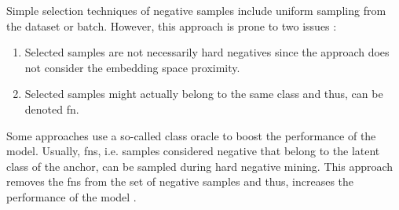 Simple selection techniques of negative samples include uniform sampling from the dataset or batch.
However, this approach is prone to two issues \citet{robinson_contrastive_2021}:
\begin{enumerate}
    \item Selected samples are not necessarily hard negatives since the approach does not consider the embedding space proximity.
    \item Selected samples might actually belong to the same class and thus, can be denoted \ac{fn}.
\end{enumerate}

Some approaches use a so-called class oracle to boost the performance of the model.
Usually, \acp{fn}, i.e. samples considered negative that belong to the latent class of the anchor,
 can be sampled during hard negative mining.
This approach removes the \acp{fn} from the set of negative samples and thus, 
increases the performance of the model \citet{mochi_2020}.